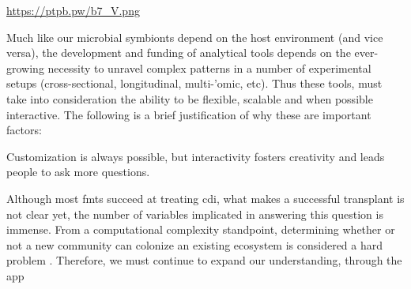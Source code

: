 \glsresetall

\url{https://ptpb.pw/b7_V.png}

Much like our microbial symbionts depend on the host environment (and vice
versa), the development and funding of analytical tools depends on the
ever-growing necessity to unravel complex patterns in a number of experimental
setups (cross-sectional, longitudinal, multi-'omic, etc). Thus these tools,
must take into consideration the ability to be flexible, scalable and when
possible interactive. The following is a brief justification of why these are
important factors:

Customization is always possible, but interactivity fosters creativity and
leads people to ask more questions.

Although most \glspl{fmt} succeed at treating \gls{cdi}, what makes a
successful transplant is not clear yet, the number of variables implicated in
answering this question is immense. From a computational complexity standpoint,
determining whether or not a new community can colonize an existing ecosystem
is considered a hard problem \cite{RN4266}. Therefore, we must continue to
expand our understanding, through the app
